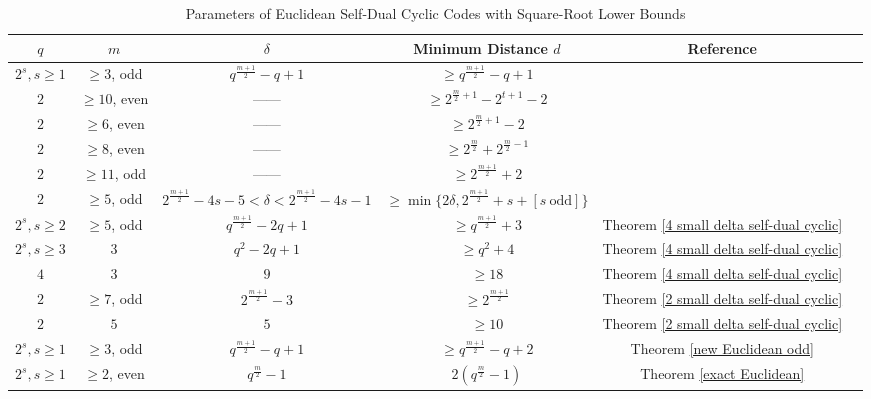 \documentclass[journal,12pt,onecolumn]{IEEEtran}
\begin{document}
\begin{table}[htbp]
    \centering
    \caption{Parameters of Euclidean Self-Dual Cyclic Codes with Square-Root Lower Bounds  }
    \label{Parameters of Euclidean Self-Dual Cyclic Codes}
    \begin{tabular}{c c c c c c}
        \hline
        $q$ & $m$ & $\delta$ & Minimum Distance $d$ & Reference \\
        \hline
        $2^s,s\ge1$ & $\ge3$, odd & $q^\frac{m+1}{2}-q+1$ & $\ge q^\frac{m+1}{2}-q+1$ & \cite{10856234} \\
        $2$ & $\ge 10$, even & —— & $\ge 2^{\frac{m}{2}+1}-2^{t+1}-2$ & \cite{wang2026constructionsselfdualbinarycyclic}\\
        $2$ & $\ge 6$, even & —— & $\ge 2^{\frac{m}{2}+1}-2$ & \cite{wang2026constructionsselfdualbinarycyclic} \\
        $2$ & $\ge 8$, even & —— & $\ge 2^\frac{m}{2}+2^{\frac{m}{2}-1}$ & \cite{wang2026constructionsselfdualbinarycyclic} \\ 
        $2$ & $\ge 11$, odd & —— & $\ge 2^{\frac{m+1}{2}}+2$ & \cite{wang2026constructionsselfdualbinarycyclic} \\        
        $2$ & $\ge5$, odd & $2^\frac{m+1}{2}-4s-5<\delta<2^\frac{m+1}{2}-4s-1$ & $\ge \min\{2\delta,2^\frac{m+1}{2}+s+[s~\text{odd}]\}$ & \cite{wang2026constructionsselfdualbinarycyclic} \\
        $2^s,s\ge 2$ & $\ge 5$, odd & $q^\frac{m+1}{2}-2q+1$ & $\ge q^\frac{m+1}{2}+3$  & Theorem \ref{4 small delta self-dual cyclic} \\
        $2^s, s\ge 3$ & $3$ & $q^2-2q+1$ & $\ge q^2+4$  & Theorem \ref{4 small delta self-dual cyclic} \\
        $4$ & $3$ & $9$ & $\ge 18$ & Theorem \ref{4 small delta self-dual cyclic} \\
        $2$ & $\ge 7$, odd  & $2^\frac{m+1}{2}-3$ & $\ge 2^\frac{m+1}{2}$ & Theorem \ref{2 small delta self-dual cyclic} \\
        $2$ & $5$ & $5$ & $\ge 10$ & Theorem \ref{2 small delta self-dual cyclic} \\
        $2^s,s\ge1$ & $\ge3$, odd & $q^\frac{m+1}{2}-q+1$ & $\ge q^\frac{m+1}{2}-q+2$ & Theorem \ref{new Euclidean odd} \\
        $2^s,s\ge1$ & $\ge 2$, even & $q^\frac{m}{2}-1$ & $2(q^\frac{m}{2}-1)$ & Theorem \ref{exact Euclidean} \\
        \hline
    \end{tabular}
\end{table}
\end{document}
